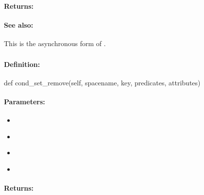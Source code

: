 \paragraph{Returns:}


\paragraph{See also:}  This is the asynchronous form of .

\pagebreak
\subsubsection{}
\label{api:python:cond_set_remove}


\paragraph{Definition:}
\begin{pythoncode}
def cond_set_remove(self, spacename, key, predicates, attributes)
\end{pythoncode}

\paragraph{Parameters:}
\begin{itemize}[noitemsep]
\item {}\\

\item {}\\

\item {}\\

\item {}\\

\end{itemize}

\paragraph{Returns:}


